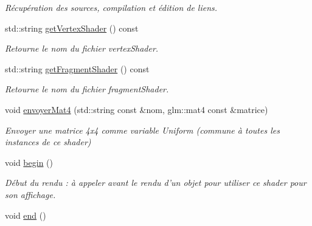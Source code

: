 \begin{DoxyCompactItemize}
\begin{DoxyCompactList}\small\item\em Récupération des sources, compilation et édition de liens. \end{DoxyCompactList}\item 
\hypertarget{classShader_aaa2ce3b8edbb1954b0b627dcb40cff7e}{std\+::string \hyperlink{classShader_aaa2ce3b8edbb1954b0b627dcb40cff7e}{get\+Vertex\+Shader} () const }\label{classShader_aaa2ce3b8edbb1954b0b627dcb40cff7e}

\begin{DoxyCompactList}\small\item\em Retourne le nom du fichier vertex\+Shader. \end{DoxyCompactList}\item 
\hypertarget{classShader_ac5069963469dcac0be6841e73de29aa3}{std\+::string \hyperlink{classShader_ac5069963469dcac0be6841e73de29aa3}{get\+Fragment\+Shader} () const }\label{classShader_ac5069963469dcac0be6841e73de29aa3}

\begin{DoxyCompactList}\small\item\em Retourne le nom du fichier fragment\+Shader. \end{DoxyCompactList}\item 
\hypertarget{classShader_a7caa048bcdc688aba0c691f56bd4c194}{void \hyperlink{classShader_a7caa048bcdc688aba0c691f56bd4c194}{envoyer\+Mat4} (std\+::string const \&nom, glm\+::mat4 const \&matrice)}\label{classShader_a7caa048bcdc688aba0c691f56bd4c194}

\begin{DoxyCompactList}\small\item\em Envoyer une matrice 4x4 comme variable Uniform (commune à toutes les instances de ce shader) \end{DoxyCompactList}\item 
\hypertarget{classShader_acf2af4edd5d98c008b9fd2de3a55c5cf}{void \hyperlink{classShader_acf2af4edd5d98c008b9fd2de3a55c5cf}{begin} ()}\label{classShader_acf2af4edd5d98c008b9fd2de3a55c5cf}

\begin{DoxyCompactList}\small\item\em Début du rendu \+: à appeler avant le rendu d'un objet pour utiliser ce shader pour son affichage. \end{DoxyCompactList}\item 
\hypertarget{classShader_abfff82b6778a0b6d1f1a599b1b306b1d}{void \hyperlink{classShader_abfff82b6778a0b6d1f1a599b1b306b1d}{end} ()}\label{classShader_abfff82b6778a0b6d1f1a599b1b306b1d}


\end{DoxyCompactItemize}
